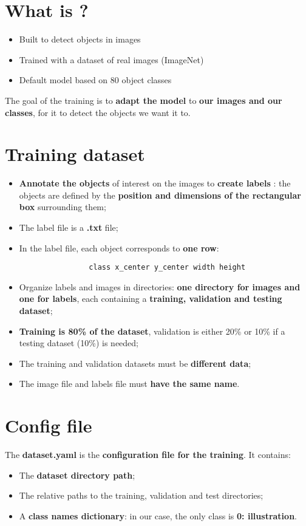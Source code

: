 \section{What is \yolov?}
	\begin{itemize}
		\item Built to detect objects in images
		\item Trained with a dataset of real images (ImageNet)
		\item Default model based on 80 object classes
	\end{itemize}

The goal of the training is to \textbf{adapt the model} to \textbf{our images and our classes}, for it to detect the objects we want it to.

\section{Training dataset}
	\begin{itemize}
		\item \textbf{Annotate the objects} of interest on the images to \textbf{create labels} : the objects are defined by the \textbf{position and dimensions of the rectangular box} surrounding them;
		\item The label file is a \textbf{.txt} file;
		\item In the label file, each object corresponds to \textbf{one row}:
			\begin{verbatim}
				class x_center y_center width height
			\end{verbatim}
		\item Organize labels and images in directories: \textbf{one directory for images and one for labels}, each containing a \textbf{training, validation and testing dataset};
		\item \textbf{Training is 80\% of the dataset}, validation is either 20\% or 10\% if a testing dataset (10\%) is needed;
		\item The training and validation datasets must be \textbf{different data};
		\item The image file and labels file must \textbf{have the same name}.
	\end{itemize}

\section{Config file}
The \textbf{dataset.yaml} is the \textbf{configuration file for the training}. It contains:
	\begin{itemize}
		\item The \textbf{dataset directory path};
		\item The relative paths to the training, validation and test directories;
		\item A \textbf{class names dictionary}: in our case, the only class is \textbf{0: illustration}.
	\end{itemize}


